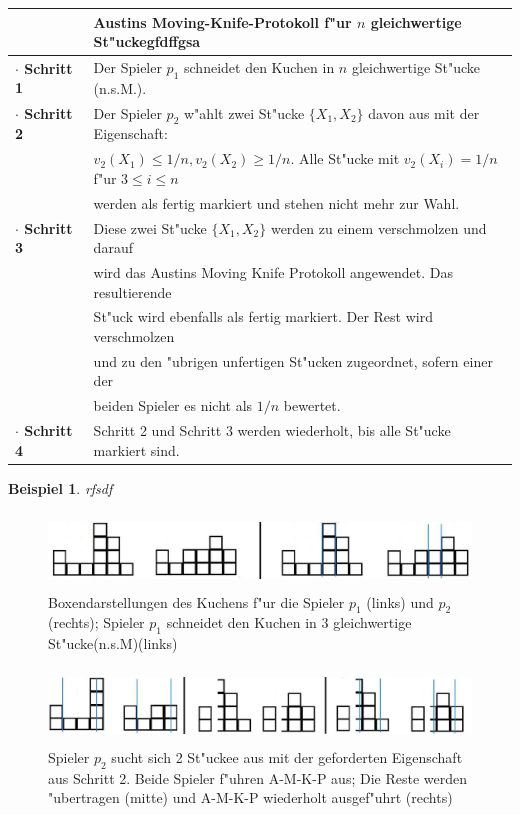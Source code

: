 \documentclass[11pt, a4paper, twoside]{article}
\newcommand{\wf}{\color{white}}
\newcommand{\tf}{\color{black}}
\newtheorem{bsp}[satz]{Beispiel}
\numberwithin{equation}{section}
\begin{document}
\newline
\begin{tabular}{|ll|}
\hline
&\textbf{Austins Moving-Knife-Protokoll f"ur $n$ gleichwertige St"ucke}\wf gfdffgsa\tf\\
\hline
\textbf{$\cdot$ Schritt 1}& Der Spieler $p_1$ schneidet den Kuchen in $n$ gleichwertige St"ucke (n.s.M.).\\
\textbf{$\cdot$ Schritt 2}& Der Spieler $p_2$ w"ahlt zwei St"ucke $\{X_1,X_2\}$ davon aus mit der Eigenschaft:\\&$v_2(X_1) \leq 1/n,v_2(X_2) \geq 1/n$. Alle St"ucke mit $v_2(X_i)=1/n$ f"ur $3\leq i \leq n$\\&werden als fertig markiert und stehen nicht mehr zur Wahl.\\
\textbf{$\cdot$ Schritt 3}& Diese zwei St"ucke $\{X_1,X_2\}$ werden zu einem verschmolzen und darauf\\&wird das Austins Moving Knife Protokoll angewendet. Das resultierende\\&St"uck wird ebenfalls als fertig markiert. Der Rest wird verschmolzen\\&und zu den "ubrigen unfertigen St"ucken zugeordnet, sofern einer der\\&beiden Spieler es nicht als $1/n$ bewertet.\\
\textbf{$\cdot$ Schritt 4}& Schritt 2 und Schritt 3 werden wiederholt, bis alle St"ucke markiert sind.\\
\hline
\end{tabular}
\begin{bsp}\wf rfsdf \end{bsp}
\begin{figure}[h!]
\includegraphics[height=2cm]{cc7.jpg}
\caption[Beispiel zum Austins Moving-Knife-Protokoll f"ur 3 gleichwertige St"ucke 1/2]{Boxendarstellungen des Kuchens f"ur die Spieler $p_1$ (links) und $p_2$ (rechts); Spieler $p_1$ schneidet den Kuchen in 3 gleichwertige St"ucke(n.s.M)(links)}
\end{figure}
\begin{figure}[h!]
\includegraphics[height=2cm]{cc9.jpg}
\caption[Beispiel zum Austins Moving-Knife-Protokoll f"ur 3 gleichwertige St"ucke 2/2]{Spieler $p_2$ sucht sich 2 St"uckee aus mit der geforderten Eigenschaft aus Schritt 2. Beide Spieler f"uhren A-M-K-P aus; Die Reste werden "ubertragen (mitte) und A-M-K-P wiederholt ausgef"uhrt (rechts)}
\end{figure}
\end{document}
